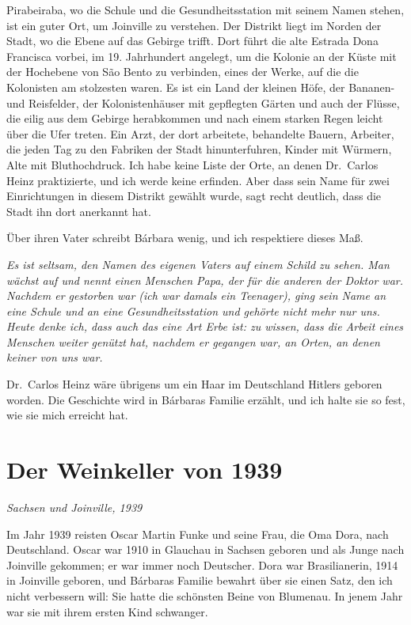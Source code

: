 \documentclass[
  ngerman,
  11pt,
  openany]{book}
\begin{document}
Pirabeiraba, wo die Schule und die Gesundheitsstation mit seinem Namen
stehen, ist ein guter Ort, um Joinville zu verstehen. Der Distrikt liegt
im Norden der Stadt, wo die Ebene auf das Gebirge trifft. Dort führt die
alte Estrada Dona Francisca vorbei, im 19. Jahrhundert angelegt, um die
Kolonie an der Küste mit der Hochebene von São Bento zu verbinden, eines
der Werke, auf die die Kolonisten am stolzesten waren. Es ist ein Land
der kleinen Höfe, der Bananen- und Reisfelder, der Kolonistenhäuser mit
gepflegten Gärten und auch der Flüsse, die eilig aus dem Gebirge
herabkommen und nach einem starken Regen leicht über die Ufer treten.
Ein Arzt, der dort arbeitete, behandelte Bauern, Arbeiter, die jeden Tag
zu den Fabriken der Stadt hinunterfuhren, Kinder mit Würmern, Alte mit
Bluthochdruck. Ich habe keine Liste der Orte, an denen Dr.~Carlos Heinz
praktizierte, und ich werde keine erfinden. Aber dass sein Name für zwei
Einrichtungen in diesem Distrikt gewählt wurde, sagt recht deutlich,
dass die Stadt ihn dort anerkannt hat.

Über ihren Vater schreibt Bárbara wenig, und ich respektiere dieses Maß.

\emph{Es ist seltsam, den Namen des eigenen Vaters auf einem Schild zu
sehen. Man wächst auf und nennt einen Menschen Papa, der für die anderen
der Doktor war. Nachdem er gestorben war (ich war damals ein Teenager),
ging sein Name an eine Schule und an eine Gesundheitsstation und gehörte
nicht mehr nur uns. Heute denke ich, dass auch das eine Art Erbe ist: zu
wissen, dass die Arbeit eines Menschen weiter genützt hat, nachdem er
gegangen war, an Orten, an denen keiner von uns war.}

Dr.~Carlos Heinz wäre übrigens um ein Haar im Deutschland Hitlers
geboren worden. Die Geschichte wird in Bárbaras Familie erzählt, und ich
halte sie so fest, wie sie mich erreicht hat.

\section{Der Weinkeller von 1939}\label{der-weinkeller-von-1939}

\emph{Sachsen und Joinville, 1939}

Im Jahr 1939 reisten Oscar Martin Funke und seine Frau, die Oma Dora,
nach Deutschland. Oscar war 1910 in Glauchau in Sachsen geboren und als
Junge nach Joinville gekommen; er war immer noch Deutscher. Dora war
Brasilianerin, 1914 in Joinville geboren, und Bárbaras Familie bewahrt
über sie einen Satz, den ich nicht verbessern will: Sie hatte die
schönsten Beine von Blumenau. In jenem Jahr war sie mit ihrem ersten
Kind schwanger.
\end{document}
